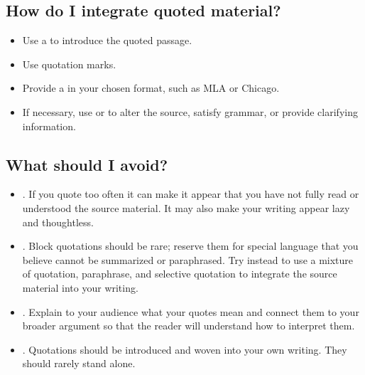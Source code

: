 \subsection{How do I integrate quoted material?}

 \begin{itemize}
\item Use a \hyperlink{signalphrase}{\color{Ahrenge}{signal phrase}} to introduce the quoted passage.

\item Use quotation marks.

\item Provide a \hyperlink{citation}{\color{Ahrenge}{citation}} in your chosen format, such as MLA or Chicago.

\item If necessary, use \hyperlink{ellipsis}{\color{Ahrenge}{ellipsis}} or \hyperlink{brackets}{\color{Ahrenge}{brackets}} to alter the source,
satisfy grammar, or provide clarifying information.

\end{itemize}


\subsection{What should I avoid?}

\begin{itemize}
\item {}. If you quote too often it can
make it appear that you have not fully read or understood the source material.
It may also make your writing appear lazy and thoughtless.

\item {}. Block quotations should
be rare; reserve them for special language that you believe cannot be
summarized or paraphrased. Try instead to use a mixture of quotation, paraphrase, and selective quotation to integrate the source material into your writing. 

\item {}. Explain to your audience what your quotes mean and connect them to your broader argument so that the reader will understand how to interpret them.

\item {}. Quotations
should be introduced and woven into your own writing. They should rarely stand alone.

\end{itemize}

